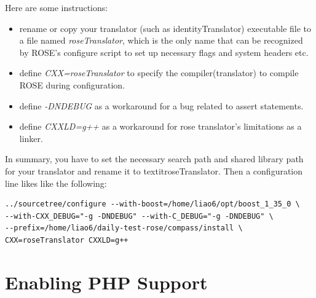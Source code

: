 Here are some instructions:
\begin{itemize}
\item rename or copy your translator (such as identityTranslator) executable file to a file named
\textit{roseTranslator}, which is the only name that can be recognized by
ROSE's configure script to set up necessary flags and system headers etc. 
\item define \textit{CXX=roseTranslator} to specify the
compiler(translator) to compile ROSE during configuration.
\item define \textit{-DNDEBUG} as a workaround for a bug related to assert
statements.
\item define \textit{CXXLD=g++} as a workaround for rose translator's
limitations as a linker.
\end{itemize}
In summary, you have to set the necessary search path and shared library
path for your translator and rename it to textit{roseTranslator}.
Then a configuration line likes like the following:

\begin{verbatim}
../sourcetree/configure --with-boost=/home/liao6/opt/boost_1_35_0 \
--with-CXX_DEBUG="-g -DNDEBUG" --with-C_DEBUG="-g -DNDEBUG" \
--prefix=/home/liao6/daily-test-rose/compass/install \ 
CXX=roseTranslator CXXLD=g++
\end{verbatim}

\section{Enabling PHP Support}%


